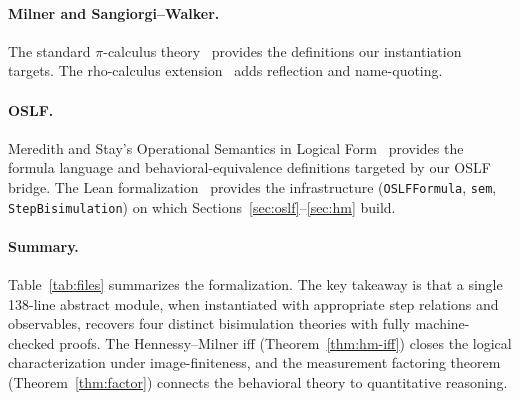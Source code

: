 \documentclass[11pt]{article}
\begin{document}
\paragraph{Milner and Sangiorgi--Walker.}
The standard $\pi$-calculus theory~\cite{Milner1999,SangiorgiWalker2001}
provides the definitions our instantiation targets.  The rho-calculus
extension~\cite{MeredithRadestock2005} adds reflection and name-quoting.

\paragraph{OSLF.}
Meredith and Stay's Operational Semantics in Logical
Form~\cite{MeredithStayOSLF2020} provides the formula language and
behavioral-equivalence definitions targeted by our OSLF bridge.
The Lean formalization~\cite{leanOSLF2025} provides the infrastructure
(\texttt{OSLFFormula}, \texttt{sem}, \texttt{StepBisimulation}) on which
Sections~\ref{sec:oslf}--\ref{sec:hm} build.

\paragraph{Summary.}
Table~\ref{tab:files} summarizes the formalization.  The key takeaway is
that a single 138-line abstract module, when instantiated with
appropriate step relations and observables, recovers four distinct
bisimulation theories with fully machine-checked proofs.  The
Hennessy--Milner iff (Theorem~\ref{thm:hm-iff}) closes the
logical characterization under image-finiteness, and the measurement
factoring theorem (Theorem~\ref{thm:factor}) connects the
behavioral theory to quantitative reasoning.
\end{document}
